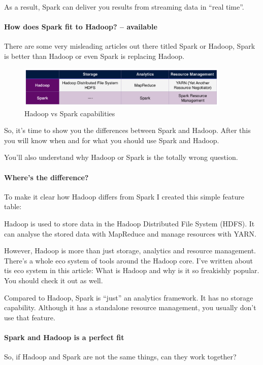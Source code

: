 \documentclass[12pt]{scrartcl} %
\begin{document}
As a result, Spark can deliver you results from streaming data in “real time”.


\paragraph{How does Spark fit to Hadoop? -- available}
There are some very misleading articles out there titled Spark or Hadoop, Spark is better than Hadoop or even Spark is replacing Hadoop.

\begin{figure}[htbp]
  \centering
     \includegraphics[width=0.9\textwidth]{images/Table-Hadoop-and-Spark}
  \caption{Hadoop vs Spark capabilities}
  \label{fig:Bild1}
\end{figure}



So, it's time to show you the differences between Spark and Hadoop. After this you will know when and for what you should use Spark and Hadoop.

You’ll also understand why Hadoop or Spark is the totally wrong question.

\paragraph{Where's the difference?}
To make it clear how Hadoop differs from Spark I created this simple feature table:


Hadoop is used to store data in the Hadoop Distributed File System (HDFS). It can analyse the stored data with MapReduce and manage resources with YARN.

However, Hadoop is more than just storage, analytics and resource management. There’s a whole eco system of tools around the Hadoop core. I’ve written about tis eco system in this article: What is Hadoop and why is it so freakishly popular. You should check it out as well.

Compared to Hadoop, Spark is “just” an analytics framework. It has no storage capability. Although it has a standalone resource management, you usually don’t use that feature.

\paragraph{Spark and Hadoop is a perfect fit}
So, if Hadoop and Spark are not the same things, can they work together?
\end{document}
